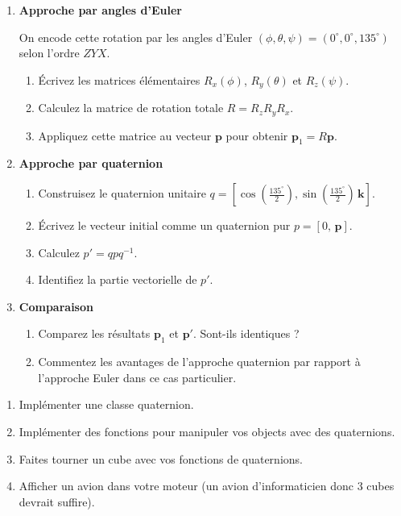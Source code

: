\documentclass[a4paper,12pt]{article}
\begin{document}
\begin{enumerate}
	\item \textbf{Approche par angles d’Euler}

	      On encode cette rotation par les angles d’Euler $(\phi, \theta, \psi) = (0^\circ, 0^\circ, 135^\circ)$ selon l’ordre $ZYX$.
	      \begin{enumerate}
		      \item Écrivez les matrices élémentaires $R_x(\phi)$, $R_y(\theta)$ et $R_z(\psi)$.
		      \item Calculez la matrice de rotation totale $R = R_z R_y R_x$.
		      \item Appliquez cette matrice au vecteur $\mathbf{p}$ pour obtenir $\mathbf{p}_1 = R \mathbf{p}$.
	      \end{enumerate}

	\item \textbf{Approche par quaternion}
	      \begin{enumerate}
		      \item Construisez le quaternion unitaire $q = \left[\cos\left(\frac{135^\circ}{2}\right), \sin\left(\frac{135^\circ}{2}\right)\,\mathbf{k}\right]$.
		      \item Écrivez le vecteur initial comme un quaternion pur $p = [0,\,\mathbf{p}]$.
		      \item Calculez $p' = q p q^{-1}$.
		      \item Identifiez la partie vectorielle de $p'$.
	      \end{enumerate}

	\item \textbf{Comparaison}
	      \begin{enumerate}
		      \item Comparez les résultats $\mathbf{p}_1$ et $\mathbf{p}'$. Sont-ils identiques ?
		      \item Commentez les avantages de l’approche quaternion par rapport à l’approche Euler dans ce cas particulier.
	      \end{enumerate}
\end{enumerate}


\label{exo:impl}

\begin{enumerate}
	\item Implémenter une classe quaternion.
	\item Implémenter des fonctions pour manipuler vos objects avec des quaternions.
	\item Faites tourner un cube avec vos fonctions de quaternions.
	\item Afficher un avion dans votre moteur (un avion d'informaticien donc 3 cubes devrait suffire).
\end{enumerate}
\end{document}
